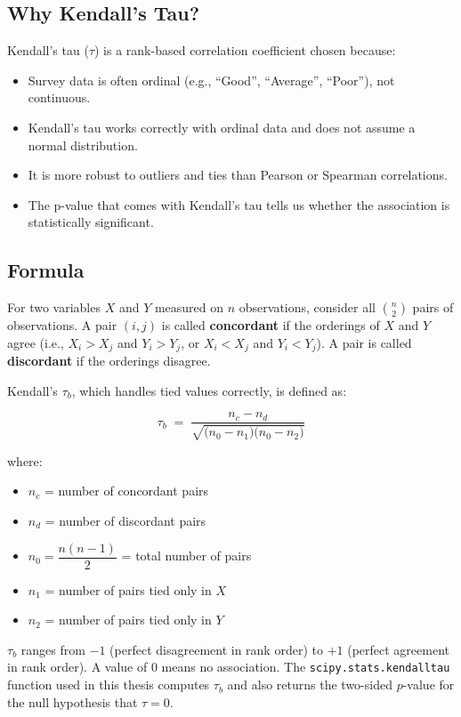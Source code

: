 \subsection{Why Kendall's Tau?}

Kendall's tau ($\tau$) is a rank-based correlation coefficient chosen because:
\begin{itemize}
    \item Survey data is often ordinal (e.g., ``Good'', ``Average'', ``Poor''), not continuous.
    \item Kendall's tau works correctly with ordinal data and does not assume a normal distribution.
    \item It is more robust to outliers and ties than Pearson or Spearman correlations.
    \item The p-value that comes with Kendall's tau tells us whether the association is statistically significant.
\end{itemize}

\subsection{Formula}

For two variables $X$ and $Y$ measured on $n$ observations, consider all $\binom{n}{2}$ pairs of observations.
A pair $(i, j)$ is called \textbf{concordant} if the orderings of $X$ and $Y$ agree (i.e., $X_i > X_j$ and $Y_i > Y_j$, or $X_i < X_j$ and $Y_i < Y_j$).
A pair is called \textbf{discordant} if the orderings disagree.

Kendall's $\tau_b$, which handles tied values correctly, is defined as:

\begin{equation}
\label{ch3-eqn-kendall}
\tau_b \;=\; \frac{n_c - n_d}{\sqrt{\bigl(n_0 - n_1\bigr)\bigl(n_0 - n_2\bigr)}}
\end{equation}

where:
\begin{itemize}
    \item $n_c$ = number of concordant pairs
    \item $n_d$ = number of discordant pairs
    \item $n_0 = \dfrac{n(n-1)}{2}$ = total number of pairs
    \item $n_1$ = number of pairs tied only in $X$
    \item $n_2$ = number of pairs tied only in $Y$
\end{itemize}

$\tau_b$ ranges from $-1$ (perfect disagreement in rank order) to $+1$ (perfect agreement in rank order). A value of 0 means no association. The \texttt{scipy.stats.kendalltau} function used in this thesis computes $\tau_b$ and also returns the two-sided $p$-value for the null hypothesis that $\tau = 0$.

